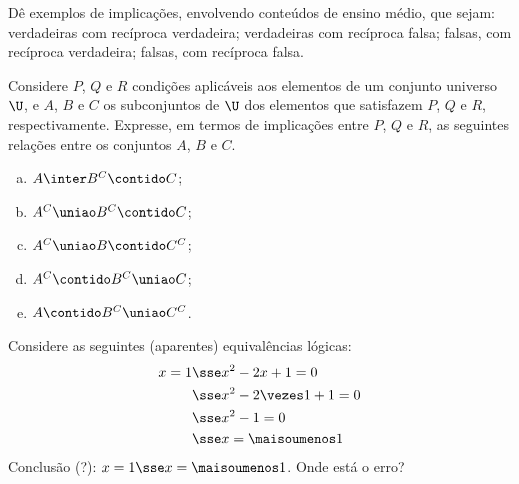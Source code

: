 \begin{exercise}
  Dê exemplos de implicações, envolvendo conteúdos de ensino médio, que sejam: verdadeiras com recíproca verdadeira; verdadeiras com recíproca falsa; falsas, com recíproca verdadeira; falsas, com recíproca falsa.
\end{exercise}

\begin{exercise}
  Considere $P$, $Q$ e $R$ condições aplicáveis aos elementos de um conjunto universo $\U$, e $A$, $B$ e $C$ os subconjuntos de $\U$ dos elementos que satisfazem $P$, $Q$ e $R$, respectivamente. Expresse, em termos de implicações entre $P$, $Q$ e $R$, as seguintes relações entre os conjuntos $A$, $B$ e $C$.
  \begin{enumerate}[a)]
    \item $A \inter B^C \contido C$;
    \item $A^C \uniao B^C \contido C$;
    \item $A^C \uniao B \contido C^C$;
    \item $A^C \contido B^C \uniao C$;
    \item $A \contido B^C \uniao C^C$.
  \end{enumerate}
\end{exercise}

\begin{exercise}
  Considere as seguintes (aparentes) equivalências lógicas:
  \begin{align*}
    x = 1 & \sse x^2 -2x +1 = 0         \\
          & \sse x^2 -2 \vezes 1 +1 = 0 \\
          & \sse x^2 - 1 = 0            \\
          & \sse x = \maisoumenos 1
  \end{align*}
  Conclusão (?): $x = 1 \sse x = \maisoumenos 1$. Onde está o erro?
\end{exercise}

